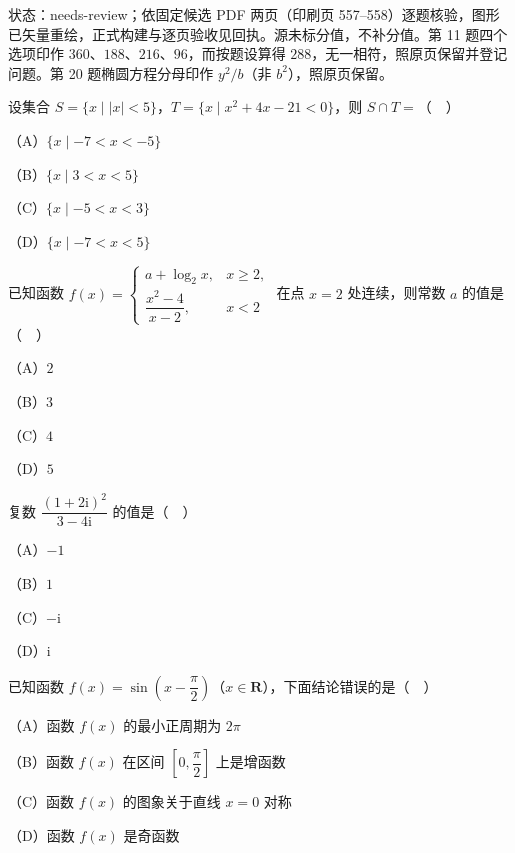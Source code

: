 

状态：needs-review；依固定候选 PDF 两页（印刷页 557–558）逐题核验，图形已矢量重绘，正式构建与逐页验收见回执。源未标分值，不补分值。第 11 题四个选项印作 $360$、$188$、$216$、$96$，而按题设算得 $288$，无一相符，照原页保留并登记问题。第 20 题椭圆方程分母印作 $y^2/b$（非 $b^2$），照原页保留。


\begin{question}
设集合 $S=\{x\mid |x|<5\}$，$T=\{x\mid x^2+4x-21<0\}$，则 $S\cap T=$（　）

（A）$\{x\mid -7<x<-5\}$

（B）$\{x\mid 3<x<5\}$

（C）$\{x\mid -5<x<3\}$

（D）$\{x\mid -7<x<5\}$

\end{question}
\begin{question}
已知函数 $f(x)=\begin{cases}a+\log_2x,&x\geqslant2,\\[4pt] \dfrac{x^2-4}{x-2},&x<2\end{cases}$ 在点 $x=2$ 处连续，则常数 $a$ 的值是（　）

（A）$2$

（B）$3$

（C）$4$

（D）$5$

\end{question}
\begin{question}
复数 $\dfrac{(1+2\mathrm i)^2}{3-4\mathrm i}$ 的值是（　）

（A）$-1$

（B）$1$

（C）$-\mathrm i$

（D）$\mathrm i$

\end{question}
\begin{question}
已知函数 $f(x)=\sin\left(x-\dfrac{\pi}{2}\right)$（$x\in\mathbf R$），下面结论错误的是（　）

（A）函数 $f(x)$ 的最小正周期为 $2\pi$

（B）函数 $f(x)$ 在区间 $\left[0,\dfrac{\pi}{2}\right]$ 上是增函数

（C）函数 $f(x)$ 的图象关于直线 $x=0$ 对称

（D）函数 $f(x)$ 是奇函数

\Needspace{0.4\textheight}
\end{question}
